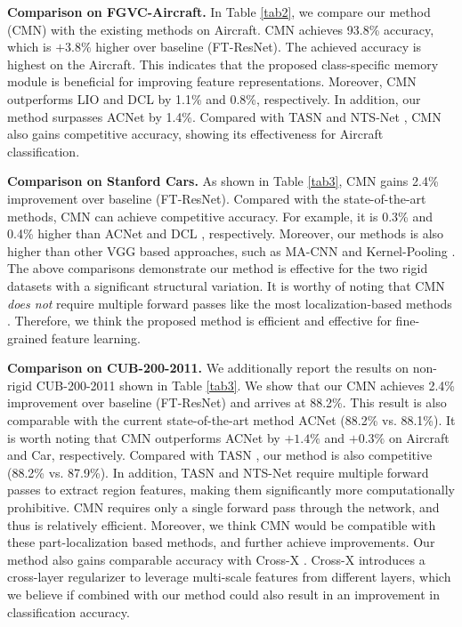 \documentclass[journal]{IEEEtran}
\begin{document}
\textbf{Comparison on FGVC-Aircraft.} In Table \ref{tab2}, we compare our method (CMN) with the existing methods on Aircraft. CMN achieves 93.8\% accuracy, which is $+3.8\%$ higher over baseline (FT-ResNet). The achieved accuracy is highest on the Aircraft. This indicates that the proposed class-specific memory module is beneficial for improving feature representations. Moreover, CMN outperforms LIO \cite{Zhou_2020_CVPR} and DCL \cite{Chen_2019_CVPR} by 1.1\% and 0.8\%, respectively. In addition, our method surpasses ACNet \cite{ji2020attention} by 1.4\%. Compared with TASN \cite{zheng2019looking} and NTS-Net \cite{yang2018learning}, CMN also gains competitive accuracy, showing its effectiveness for Aircraft classification.

\textbf{Comparison on Stanford Cars.} As shown in Table \ref{tab3}, CMN gains 2.4\% improvement over baseline (FT-ResNet). Compared with the state-of-the-art methods, CMN can achieve competitive accuracy. For example, it is 0.3\% and 0.4\% higher than ACNet \cite{ji2020attention} and DCL \cite{wang2018learning}, respectively. 
Moreover, our methods is also higher than other VGG based approaches, such as MA-CNN \cite{zheng2017learning} and Kernel-Pooling \cite{cui2017kernel}.
The above comparisons demonstrate our method is effective for the two rigid datasets with a significant structural variation. It is worthy of noting that CMN \emph{does not} require multiple forward passes like the most localization-based methods \cite{yang2018learning,zheng2019looking}. Therefore, we think the proposed method is efficient and effective for fine-grained feature learning.

\textbf{Comparison on CUB-200-2011.} We additionally report the results on non-rigid CUB-200-2011 shown in Table \ref{tab3}. We show that our CMN achieves 2.4\% improvement over baseline (FT-ResNet) and arrives at 88.2\%. This result is also comparable with the current state-of-the-art method ACNet \cite{ji2020attention} (88.2\% vs. 88.1\%). It is worth noting that CMN outperforms ACNet by $+1.4\%$ and $+0.3\%$ on Aircraft and Car, respectively.
Compared with TASN \cite{zheng2019looking}, our method is also competitive (88.2\% vs. 87.9\%). In addition, TASN and NTS-Net \cite{yang2018learning} require multiple forward passes to extract region features, making them significantly more computationally prohibitive. CMN requires only a single forward pass through the network, and thus is relatively efficient. Moreover, we think CMN would be compatible with these part-localization based methods, and further achieve improvements.
Our method also gains comparable accuracy with Cross-X \cite{luo2019cross}. Cross-X introduces a cross-layer regularizer to leverage multi-scale features from different layers, which we believe if combined with our method could also result in an improvement in classification accuracy.
\end{document}
